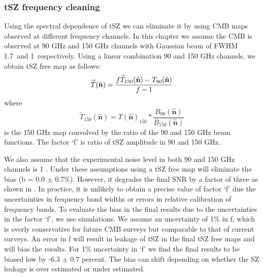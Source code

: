 \subsubsection{tSZ frequency cleaning}
\label{subsec:tszbias}
 Using the spectral dependence of tSZ we can eliminate it by using CMB maps observed at different frequency channels.
 In this chapter we assume the CMB is observed at 90 GHz and 150 GHz channels with Gaussian beam of FWHM 1.7\am\ and 1\am\ respectively.
Using a linear combination 90 and 150 GHz channels, we obtain tSZ free map as follows:
 \begin{equation}
\widetilde{T}(\hat{\textbf{n}})  =  \frac{f\widetilde{T}_{{150}}(\hat{\textbf{n}}) - T_{{90}}(\hat{\textbf{n}})}{f-1}\\
\end{equation}
where
 \begin{equation}
 \widetilde{T}_{{150}}(\hat{\textbf{n}})  =  T(\hat{\textbf{n}})_{{150}} \ast \frac{B_{{90}}(\hat{\textbf{n}})}{B_{{150}}(\hat{\textbf{n}})}
 \label{eq_smooth}
 \end{equation}
 is the 150 GHz map convolved by the ratio of the 90 and 150 GHz beam functions. 
 The factor `f' is ratio of tSZ amplitude in 90 and 150 GHz. %
 
We also assume that the experimental noise level in both 90 and 150 GHz channels is 1 \ukam. 
  Under these assumptions using a tSZ free map will eliminate the bias (b = 0.0 $\pm$ 0.7\%). However, it degrades the final SNR by a factor of three as shown in \citet{baxter15}.
  In practice, it is unlikely to obtain a precise value of factor `f' due the uncertainties in frequency band widths or errors in relative calibration of frequency bands.
  To evaluate the bias in the final results due to the uncertainties in the factor `f', we use simulations. 
  We assume an uncertainty of 1\% in f, which is overly conservative for future CMB surveys but comparable to that of current surveys.
 An error in f will result in leakage of tSZ in the final tSZ free maps and will bias the results.
 For 1\% uncertainty in `f' we find the final results to be biased low by -6.3 $\pm$ 0.7 percent. 
 The bias can shift depending on whether the SZ leakage is over estimated or under estimated.
  
